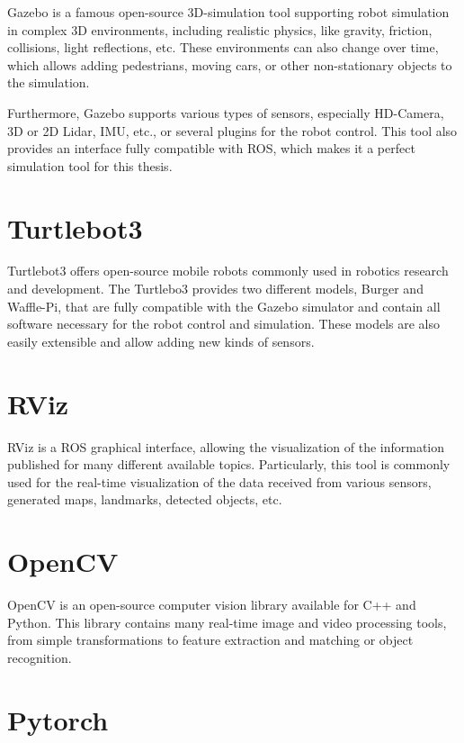 Gazebo is a famous open-source 3D-simulation tool supporting robot simulation in complex 3D environments, including realistic physics, like gravity, friction, collisions, light reflections, etc. These environments can also change over time, which allows adding pedestrians, moving cars, or other non-stationary objects to the simulation.\par
Furthermore, Gazebo supports various types of sensors, especially HD-Camera, 3D or 2D Lidar, IMU, etc., or several plugins for the robot control. This tool also provides an interface fully compatible with ROS, which makes it a perfect simulation tool for this thesis.

\section{Turtlebot3}\label{section:turtlebot}

Turtlebot3 offers open-source mobile robots commonly used in robotics research and development. The Turtlebo3 provides two different models, Burger and Waffle-Pi, that are fully compatible with the Gazebo simulator and contain all software necessary for the robot control and simulation. These models are also easily extensible and allow adding new kinds of sensors.

\section{RViz}\label{section:rviz}

RViz is a ROS graphical interface, allowing the visualization of the information published for many different available topics. Particularly, this tool is commonly used for the real-time visualization of the data received from various sensors, generated maps, landmarks, detected objects, etc.

\section{OpenCV}\label{section:openCv}

OpenCV is an open-source computer vision library available for C++ and Python. This library contains many real-time image and video processing tools, from simple transformations to feature extraction and matching or object recognition.

\section{Pytorch}\label{section:pytorch}

